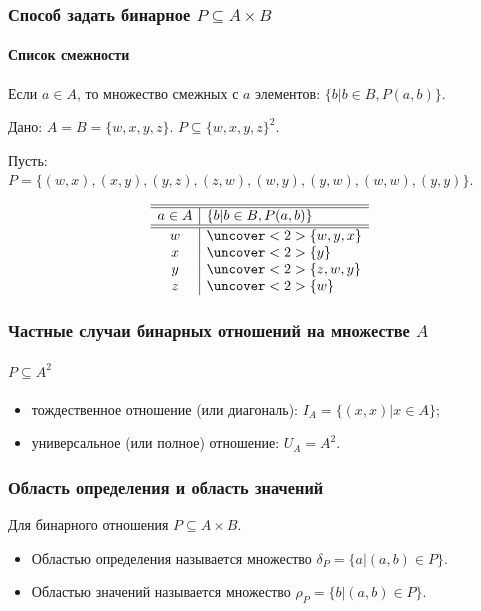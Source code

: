 \begin{frame}
    \frametitle{Способ задать бинарное $P\subseteq A\times B$}
    \framesubtitle{Список смежности}
    
    Если $a\in A$, то множество смежных с $a$ элементов: $\{b|b\in B, P(a,b)\}$.
    
    \begin{example}
        Дано: $A=B=\{w,x,y,z\}$. $P\subseteq \{w,x,y,z\}^2$.
        
        Пусть: $P=\{(w,x),(x,y),(y,z),(z,w),(w,y),(y,w),(w,w),(y,y)\}$.
    \end{example}
    
    \[
        \begin{array}{c|l}
            \hline\hline
            a\in A&\{b|b\in B, P(a,b)\} \\ 
            \hline\hline
            w   &\uncover<2>{\{w,y,x\}}  \\
            x   &\uncover<2>{\{y\}}      \\
            y   &\uncover<2>{\{z,w,y\}}  \\
            z   &\uncover<2>{\{w\}}
        \end{array}
    \]
\end{frame}

\begin{frame}
    \frametitle{Частные случаи бинарных отношений на множестве $A$}
    \framesubtitle{$P\subseteq A^2$}
    
    \begin{itemize}
        \item \alert{тождественное} отношение (или \alert{диагональ}): $I_A=\{(x,x)|x\in A\}$;
        \item \alert{универсальное} (или \alert{полное}) отношение: $U_A=A^2$.
    \end{itemize}
\end{frame}

\begin{frame}
    \frametitle{Область определения и область значений}
    
    Для бинарного отношения $P\subseteq A\times B$.
    \begin{itemize}
        \item \alert{Областью определения} называется множество $\delta_P=\{a|(a,b)\in P\}$.
        \item \alert{Областью значений} называется множество $\rho_P=\{b|(a,b)\in P\}$.
    \end{itemize}
\end{frame}

